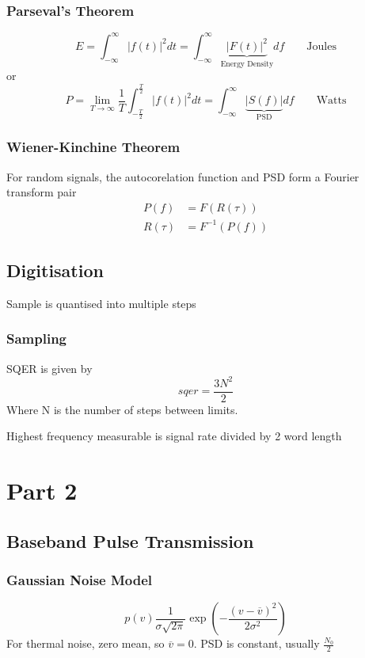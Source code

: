\documentclass[a4paper,twocolumn]{article}
\newcommand{\infint}{ \int_{-\infty}^{\infty}}
\begin{document}
			\subsubsection{Parseval's Theorem}
				\begin{equation}
					E =  \infint \left| f(t)\right|^2 dt =
					\infint \underbrace{ \left| F(t)\right|^2 }_{\text{Energy Density}} df 
					\qquad \mathrm{Joules}
				\end{equation}
				or
				\begin{equation}
					P =\lim_{T \to \infty} \frac{1}{T} \int^{\frac{T}{2}}_{-\frac{T}{2}} 
					\left| f(t)\right|^2 dt =
					\infint \underbrace{ \left| S(f)\right| }_{\text{PSD}} df \qquad
					\mathrm{Watts}
				\end{equation}
			\subsubsection{Wiener-Kinchine Theorem}
				For random signals, the autocorelation function and PSD form a Fourier transform pair
					\begin{align}
						P(f) &= F(R(\tau)) \\
						R(\tau) &= F^{-1}(P(f))
					\end{align}
		\subsection{Digitisation}
			Sample is quantised into multiple steps
			\subsubsection{Sampling}
			SQER is given by
				\begin{equation}
					sqer = \frac{3N^2}{2}
				\end{equation}
			Where N is the number of steps between limits.

			Highest frequency measurable is signal rate divided by 2 word length
	\section{Part 2}
		\subsection{Baseband Pulse Transmission}
			\subsubsection{Gaussian Noise Model}
				\begin{equation}
					p(v) \frac{1}{\sigma \sqrt{2 \pi}}
					\exp\left( -\frac{(v - \overline{v})^2}{2\sigma^2}\right)
				\end{equation}
				For thermal noise, zero mean, so $\overline{v} =0$. PSD is constant, usually
				$\frac{N_0}{2}$
\end{document}
